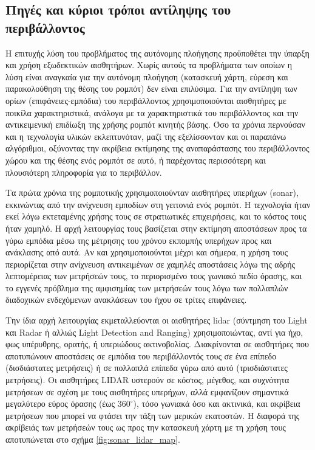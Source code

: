 \subsection{Πηγές και κύριοι τρόποι αντίληψης του περιβάλλοντος}
\label{subsec:01_01_01_2}

Η επιτυχής λύση του προβλήματος της αυτόνομης πλοήγησης προϋποθέτει την ύπαρξη
και χρήση εξωδεκτικών αισθητήρων. Χωρίς αυτούς τα προβλήματα των οποίων η λύση
είναι αναγκαία για την αυτόνομη πλοήγηση (κατασκευή χάρτη, εύρεση και
παρακολούθηση της θέσης του ρομπότ) δεν είναι επιλύσιμα. Για την αντίληψη των
ορίων (επιφάνειες-εμπόδια) του περιβάλλοντος χρησιμοποιούνται αισθητήρες με
ποικίλα χαρακτηριστικά, ανάλογα με τα χαρακτηριστικά του περιβάλλοντος και
την αντικειμενική επιδίωξη της χρήσης ρομπότ κινητής βάσης. Όσο τα χρόνια
περνούσαν και η τεχνολογία υλικών εκλεπτυνόταν, μαζί της εξελίσσονταν και
οι παραπάνω αλγόριθμοι, οξύνοντας την ακρίβεια εκτίμησης της αναπαράστασης
του περιβάλλοντος χώρου και της θέσης ενός ρομπότ σε αυτό, ή παρέχοντας
περισσότερη και πλουσιότερη πληροφορία για το περιβάλλον.

Τα πρώτα χρόνια της ρομποτικής χρησιμοποιούνταν αισθητήρες υπερήχων (sonar),
εκκινώντας από την ανίχνευση εμποδίων στη γειτονιά ενός ρομπότ. Η τεχνολογία
ήταν εκεί λόγω εκτεταμένης χρήσης τους σε στρατιωτικές επιχειρήσεις, και το
κόστος τους ήταν χαμηλό. Η αρχή λειτουργίας τους βασίζεται στην εκτίμηση
αποστάσεων προς τα γύρω εμπόδια μέσω της μέτρησης του χρόνου εκπομπής υπερήχων
προς και ανάκλασης από αυτά. Αν και χρησιμοποιούνται μέχρι και σήμερα, η χρήση
τους περιορίζεται στην ανίχνευση αντικειμένων σε χαμηλές αποστάσεις λόγω της
αδρής λεπτομέρειας των μετρήσεών τους, το περιορισμένο τους γωνιακό πεδίο
όρασης, και το εγγενές πρόβλημα της αμφισημίας των μετρήσεών τους λόγω των
πολλαπλών διαδοχικών ενδεχόμενων ανακλάσεων του ήχου σε τρίτες επιφάνειες.

Την ίδια αρχή λειτουργίας εκμεταλλεύονται οι αισθητήρες lidar (σύντμηση του
Light και Radar ή αλλιώς Light Detection and Ranging) χρησιμοποιώντας, αντί για
ήχο, φως υπέρυθρης, ορατής, ή υπεριώδους ακτινοβολίας. Διακρίνονται σε
αισθητήρες που αποτυπώνουν αποστάσεις σε εμπόδια του περιβάλλοντός τους σε ένα
επίπεδο (δισδιάστατες μετρήσεις) ή σε πολλαπλά επίπεδα γύρω από αυτό
(τρισδιάστατες μετρήσεις). Οι αισθητήρες LIDAR υστερούν σε κόστος, μέγεθος, και
συχνότητα μετρήσεων σε σχέση με τους αισθητήρες υπερήχων, αλλά εμφανίζουν
σημαντικά μεγαλύτερο εύρος όρασης (έως $360^\circ$), τόσο γωνιακά όσο και
ακτινικά, και ακρίβεια μετρήσεων που μπορεί να φτάσει την τάξη των μερικών
εκατοστών.  Η διαφορά της ακρίβειάς των μετρήσεών τους ως προς την κατασκευή
χάρτη με τη χρήση τους αποτυπώνεται στο σχήμα \ref{fig:sonar_lidar_map}.

